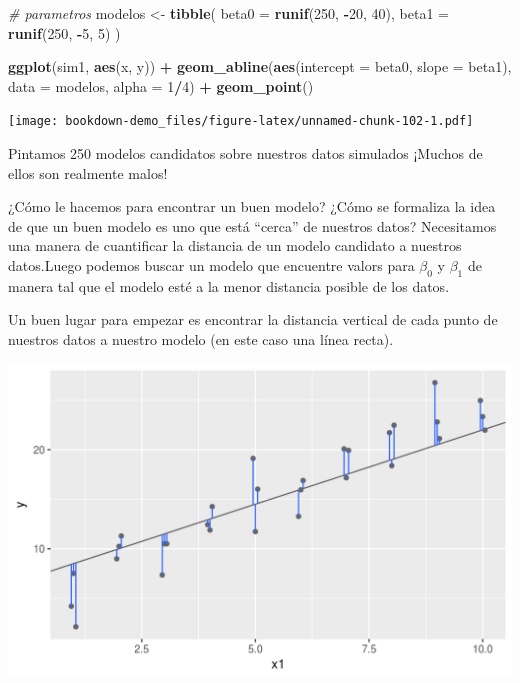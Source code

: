 \documentclass[]{book}
\newenvironment{Shaded}{\begin{snugshade}}{\end{snugshade}}
\newcommand{\KeywordTok}[1]{\textcolor[rgb]{0.13,0.29,0.53}{\textbf{#1}}}
\newcommand{\DataTypeTok}[1]{\textcolor[rgb]{0.13,0.29,0.53}{#1}}
\newcommand{\DecValTok}[1]{\textcolor[rgb]{0.00,0.00,0.81}{#1}}
\newcommand{\StringTok}[1]{\textcolor[rgb]{0.31,0.60,0.02}{#1}}
\newcommand{\CommentTok}[1]{\textcolor[rgb]{0.56,0.35,0.01}{\textit{#1}}}
\newcommand{\OperatorTok}[1]{\textcolor[rgb]{0.81,0.36,0.00}{\textbf{#1}}}
\newcommand{\NormalTok}[1]{#1}
\theoremstyle{definition}
\theoremstyle{definition}
\theoremstyle{definition}
\theoremstyle{remark}
\begin{document}
\begin{Shaded}
\begin{Highlighting}[]
\CommentTok{# parametros}
\NormalTok{modelos <-}\StringTok{ }\KeywordTok{tibble}\NormalTok{(}
  \DataTypeTok{beta0 =} \KeywordTok{runif}\NormalTok{(}\DecValTok{250}\NormalTok{, }\OperatorTok{-}\DecValTok{20}\NormalTok{, }\DecValTok{40}\NormalTok{),}
  \DataTypeTok{beta1 =} \KeywordTok{runif}\NormalTok{(}\DecValTok{250}\NormalTok{, }\OperatorTok{-}\DecValTok{5}\NormalTok{, }\DecValTok{5}\NormalTok{)}
\NormalTok{)}

\KeywordTok{ggplot}\NormalTok{(sim1, }\KeywordTok{aes}\NormalTok{(x, y)) }\OperatorTok{+}\StringTok{ }
\StringTok{  }\KeywordTok{geom_abline}\NormalTok{(}\KeywordTok{aes}\NormalTok{(}\DataTypeTok{intercept =}\NormalTok{ beta0, }\DataTypeTok{slope =}\NormalTok{ beta1), }\DataTypeTok{data =}\NormalTok{ modelos, }\DataTypeTok{alpha =} \DecValTok{1}\OperatorTok{/}\DecValTok{4}\NormalTok{) }\OperatorTok{+}
\StringTok{  }\KeywordTok{geom_point}\NormalTok{()}
\end{Highlighting}
\end{Shaded}

\texttt{[image: bookdown-demo\_files/figure-latex/unnamed-chunk-102-1.pdf]}

Pintamos 250 modelos candidatos sobre nuestros datos simulados ¡Muchos
de ellos son realmente malos!

¿Cómo le hacemos para encontrar un buen modelo? ¿Cómo se formaliza la
idea de que un buen modelo es uno que está ``cerca'' de nuestros datos?
Necesitamos una manera de cuantificar la distancia de un modelo
candidato a nuestros datos.Luego podemos buscar un modelo que encuentre
valors para \(\beta_{0}\) y \(\beta_{1}\) de manera tal que el modelo
esté a la menor distancia posible de los datos.

Un buen lugar para empezar es encontrar la distancia vertical de cada
punto de nuestros datos a nuestro modelo (en este caso una línea recta).

\includegraphics[width=16in]{./imagenes/dists}
\end{document}
